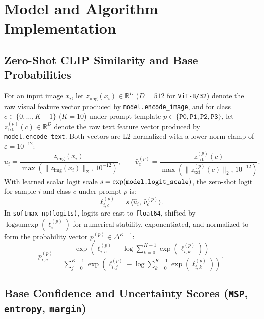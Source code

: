 \documentclass[11pt,a4paper]{article}
\begin{document}
\section{Model and Algorithm Implementation}

\subsection{Zero-Shot CLIP Similarity and Base Probabilities}

For an input image $x_i$, let $z_{\text{img}}(x_i) \in \mathbb{R}^D$ ($D = 512$ for \texttt{ViT-B/\allowbreak{}32}) denote the raw visual feature vector produced by \texttt{model.\allowbreak{}encode\_\allowbreak{}image}, and for class $c \in \{0, \dots, K-1\}$ ($K = 10$) under prompt template $p \in \{\texttt{P0}, \texttt{P1}, \texttt{P2}, \texttt{P3}\}$, let $z_{\text{txt}}^{(p)}(c) \in \mathbb{R}^D$ denote the raw text feature vector produced by \texttt{model.\allowbreak{}encode\_\allowbreak{}text}. Both vectors are L2-normalized with a lower norm clamp of $\varepsilon = 10^{-12}$:
\begin{equation}
  \hat{u}_i = \frac{z_{\text{img}}(x_i)}{\max\!\left(\|z_{\text{img}}(x_i)\|_2, \, 10^{-12}\right)}, \qquad
  \hat{v}_c^{(p)} = \frac{z_{\text{txt}}^{(p)}(c)}{\max\!\left(\|z_{\text{txt}}^{(p)}(c)\|_2, \, 10^{-12}\right)}.
\end{equation}
With learned scalar logit scale $s = \exp(\texttt{model.\allowbreak{}logit\_\allowbreak{}scale})$, the zero-shot logit for sample $i$ and class $c$ under prompt $p$ is:
\begin{equation}
  \ell_{i,c}^{(p)} = s \, \langle \hat{u}_i, \, \hat{v}_c^{(p)} \rangle.
\end{equation}
In \texttt{softmax\_\allowbreak{}np(\allowbreak{}logits)}, logits are cast to \texttt{float64}, shifted by $\operatorname{logsumexp}(\ell_i^{(p)})$ for numerical stability, exponentiated, and normalized to form the probability vector $p_i^{(p)} \in \Delta^{K-1}$:
\begin{equation}
  p_{i,c}^{(p)} = \frac{\exp\!\left(\ell_{i,c}^{(p)} - \log \sum_{k=0}^{K-1} \exp(\ell_{i,k}^{(p)})\right)}{\sum_{j=0}^{K-1} \exp\!\left(\ell_{i,j}^{(p)} - \log \sum_{k=0}^{K-1} \exp(\ell_{i,k}^{(p)})\right)}.
\end{equation}

\subsection{Base Confidence and Uncertainty Scores (\texttt{MSP}, \texttt{entropy}, \texttt{margin})}
\end{document}
